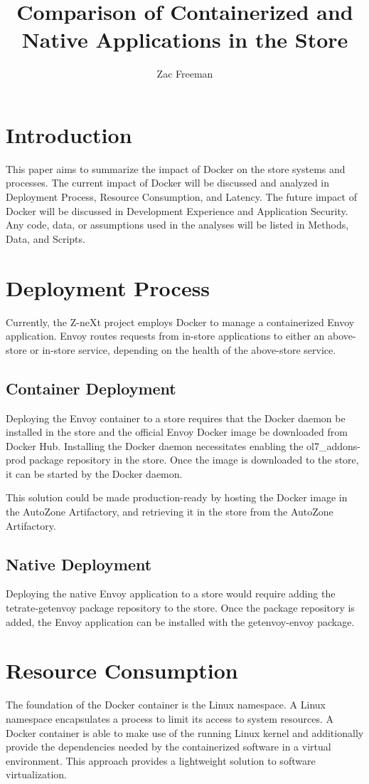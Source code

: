 \documentclass{article}
\title{Comparison of Containerized and Native Applications in the Store}
\author{Zac Freeman}
\begin{document}
\maketitle

\section{Introduction}
This paper aims to summarize the impact of Docker on the store systems and processes. The current impact of Docker will be discussed and analyzed in Deployment Process, Resource Consumption, and Latency. The future impact of Docker will be discussed in Development Experience and Application Security. Any code, data, or assumptions used in the analyses will be listed in Methods, Data, and Scripts.

\section{Deployment Process}
Currently, the Z-neXt project employs Docker to manage a containerized Envoy application. Envoy routes requests from in-store applications to either an above-store or in-store service, depending on the health of the above-store service.

\subsection{Container Deployment}
Deploying the Envoy container to a store requires that the Docker daemon be installed in the store and the official Envoy Docker image be downloaded from Docker Hub. Installing the Docker daemon necessitates enabling the ol7\_addons-prod package repository in the store. Once the image is downloaded to the store, it can be started by the Docker daemon.

This solution could be made production-ready by hosting the Docker image in the AutoZone Artifactory, and retrieving it in the store from the AutoZone Artifactory.

\subsection{Native Deployment}
Deploying the native Envoy application to a store would require adding the tetrate-getenvoy package repository to the store. Once the package repository is added, the Envoy application can be installed with the getenvoy-envoy package.

\section{Resource Consumption}
The foundation of the Docker container is the Linux namespace. A Linux namespace encapsulates a process to limit its access to system resources. A Docker container is able to make use of the running Linux kernel and additionally provide the dependencies needed by the containerized software in a virtual environment. This approach provides a lightweight solution to software virtualization.
\end{document}

